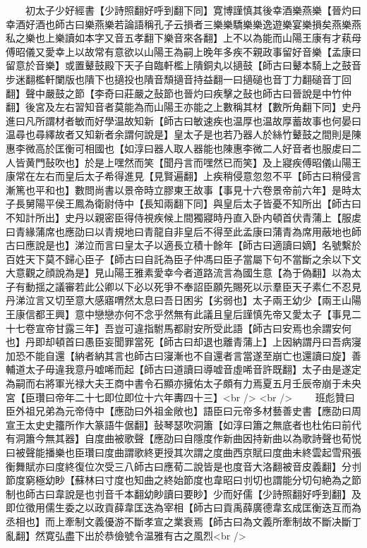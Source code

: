 　　初太子少好經書【少詩照翻好呼到翻下同】寛博謹慎其後幸酒樂燕樂【晉灼曰幸酒好酒也師古曰樂燕樂若論語稱孔子云損者三樂樂驕樂樂逸遊樂宴樂損矣燕樂燕私之樂也上樂讀如本字又音五孝翻下樂音來各翻】上不以為能而山陽王康有才萟母傅昭儀又愛幸上以故常有意欲以山陽王為嗣上晚年多疾不親政事留好音樂【孟康曰留意於音樂】或置鼙鼓殿下天子自臨軒檻上隤銅丸以擿鼓【師古曰鼙本騎上之鼓音步迷翻檻軒闌版也隤下也擿投也隤音頹擿音持益翻一曰擿磓也音丁力翻磓音丁回翻】聲中嚴鼓之節【李奇曰莊嚴之鼔節也晉灼曰疾擊之鼔也師古曰晉說是中竹仲翻】後宮及左右習知音者莫能為而山陽王亦能之上數稱其材【數所角翻下同】史丹進曰凡所謂材者敏而好學温故知新【師古曰敏速疾也温厚也温故厚蓄故事也何晏曰温尋也尋繹故者又知新者余謂何說是】皇太子是也若乃器人於絲竹鼙鼓之間則是陳惠李微高於匡衡可相國也【如淳曰器人取人器能也陳惠李微二人好音者也服䖍曰二人皆黄門鼔吹也】於是上嘿然而笑【聞丹言而嘿然已而笑】及上寢疾傅昭儀山陽王康常在左右而皇后太子希得進見【見賢遍翻】上疾稍侵意忽忽不平【師古曰稍侵言漸篤也平和也】數問尚書以景帝時立膠東王故事【事見十六卷景帝前六年】是時太子長舅陽平侯王鳳為衛尉侍中【長知兩翻下同】與皇后太子皆憂不知所出【師古曰不知計所出】史丹以親密臣得侍視疾候上間獨寢時丹直入卧内頓首伏青蒲上【服䖍曰青緣蒲席也應劭曰以青規地曰青龍自非皇后不得至此孟康曰蒲青為席用蔽地也師古曰應說是也】涕泣而言曰皇太子以適長立積十餘年【師古曰適讀曰嫡】名號繫於百姓天下莫不歸心臣子【師古曰自託為臣子仲馮曰臣子當屬下句不當斷之余以下文大意觀之顔說為是】見山陽王雅素愛幸今者道路流言為國生意【為于偽翻】以為太子有動揺之議審若此公卿以下必以死爭不奉詔臣願先賜死以示羣臣天子素仁不忍見丹涕泣言又切至意大感寤喟然太息曰吾日困劣【劣弱也】太子兩王幼少【兩王山陽王康信都王興】意中戀戀亦何不念乎然無有此議且皇后謹慎先帝又愛太子【事見二十七卷宣帝甘露三年】吾豈可違指駙馬都尉安所受此語【師古曰安焉也余謂安何也】丹即却頓首曰愚臣妄聞罪當死【師古曰却退也離青蒲上】上因納謂丹曰吾病寖加恐不能自還【納者納其言也師古曰寖漸也不自還者言當遂至崩亡也還讀曰旋】善輔道太子毋違我意丹嘘唏而起【師古曰道讀曰導嘘音虛唏音許既翻】太子由是遂定為嗣而右將軍光禄大夫王商中書令石顯亦擁佑太子頗有力焉夏五月壬辰帝崩于未央宮【臣瓚曰帝年二十七即位即位十六年夀四十三】<br />
<br />
　　班彪贊曰臣外祖兄弟為元帝侍中【應劭曰外祖金敞也】語臣曰元帝多材藝善史書【應劭曰周宣王太史史籒所作大篆語牛倨翻】鼔琴瑟吹洞簫【如淳曰簫之無底者也杜佑曰前代有洞簫今無其器】自度曲被歌聲【應劭曰自隱度作新曲因持新曲以為歌詩聲也荀悦曰被聲能播樂也臣瓚曰度曲謂歌終更授其次謂之度曲西京賦曰度曲未終雲起雪飛張衡舞賦亦曰度終復位次受三八師古曰應荀二說皆是也度音大洛翻被音皮義翻】分刌節度窮極幼眇【蘇林曰寸度也知曲之終始節度也韋昭曰刌切也謂能分切句絶為之節制也師古曰韋說是也刌音千本翻幼眇讀曰要眇】少而好儒【少詩照翻好呼到翻】及即位徵用儒生委之以政貢薛韋匡迭為宰相【師古曰貢禹薛廣德韋玄成匡衡迭互而為丞相也】而上牽制文義優游不斷孝宣之業衰焉【師古曰為文義所牽制故不斷决斷丁亂翻】然寛弘盡下出於恭儉號令温雅有古之風烈<br />
